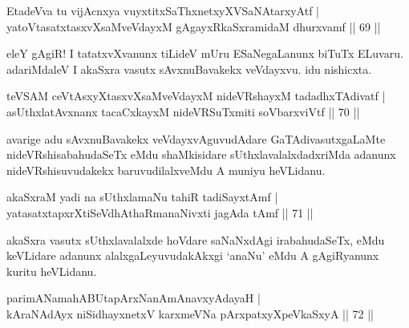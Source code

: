 \begin{shl}
EtadeVva tu vijAcnxya vuyxtitxSaThxnetxyXVSaNAtarxyAtf |\\
yatoV\s tasatxtasxvXsaMveVdayxM gAgayxRkaSxramidaM dhurxvamf \hfill || 69 ||
\end{shl}

\begin{artha}
eleY gAgiR! I tatatxvXvanunx tiLideV mUru ESaNegaLanunx biTuTx ELuvaru. adariMdaleV I akaSxra vasutx sAvxnuBavakekx veVdayxvu. idu nishicxta.
\end{artha}


\begin{shl}
teVSAM ceVtAsxyXtasxvXsaMveVdayxM nideVRshayxM tadadhxTAdivatf |\\
asUthxlatAvxnanx tacaCxkayxM nideVRSuTxmiti soV\s barxviVtf \hfill || 70 ||
\end{shl}

\begin{artha}
avarige adu sAvxnuBavakekx veVdayxvAguvudAdare GaTAdivasutxgaLaMte nideVRshisabahudaSeTx eMdu shaMkisidare sUthxlavalalxdadxriMda adanunx nideVRshisuvudakekx baruvudilalxveMdu A muniyu heVLidanu.
\end{artha}


\begin{shl}
akaSxraM yadi na sUthxlamaNu tahiR tadiSayxtAmf |\\
yatasatxtapxrXtiSeVdhAthaRmanaNivxti jagAda tAmf \hfill || 71 ||
\end{shl}

\begin{artha}
akaSxra vasutx sUthxlavalalxde hoVdare saNaNxdAgi irabahudaSeTx, eMdu keVLidare adanunx alalxgaLeyuvudakAkxgi `anaNu' eMdu A gAgiRyanunx kuritu heVLidanu.
\end{artha}


\begin{shl}
parimANamahABUtapArxNanAmAnavxyAdayaH |\\
kAraNAdAyx niSidhayxnetxV karxmeVNa pArxpatxyXpeVkaSxyA \hfill || 72 ||
\end{shl}

